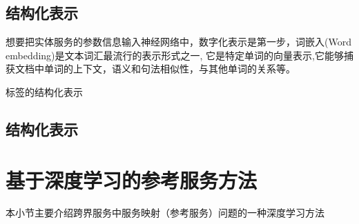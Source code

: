   \subsection{结构化表示}
  想要把实体服务的参数信息输入神经网络中，数字化表示是第一步，词嵌入(Word embedding)是文本词汇最流行的表示形式之一,
  它是特定单词的向量表示,它能够捕获文档中单词的上下文，语义和句法相似性，与其他单词的关系等。

  标签的结构化表示

  \subsection{结构化表示}




\section{基于深度学习的参考服务方法}
本小节主要介绍跨界服务中服务映射（参考服务）问题的一种深度学习方法



